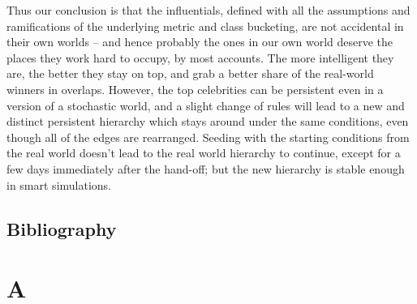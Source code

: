 \documentclass[10pt,oneside]{memoir}
\def\mybibliostyle{plain}
\def\bibliocommand{}
\begin{document}
Thus our conclusion is that the influentials, defined with all the assumptions and ramifications of the underlying metric and class bucketing, are not accidental in their own worlds -- and hence probably the ones in our own world deserve the places they work hard to occupy, by most accounts.  The more intelligent they are, the better they stay on top, and grab a better share of the real-world winners in overlaps.  However, the top celebrities can be persistent even in a version of a stochastic world, and a slight change of rules will lead to a new and distinct persistent hierarchy which stays around under the same conditions, even though all of the edges are rearranged.  Seeding with the starting conditions from the real world doesn't lead to the real world hierarchy to continue, except for a few days immediately after the hand-off; but the new hierarchy is stable enough in smart simulations.


\section{Bibliography}
\label{bibliography}






\appendixpage
\appendix
\chapter{A}
\pagestyle{plain}


%
%

\backmatter


\bibliocommand

\printglossary


\printindex
\end{document}
